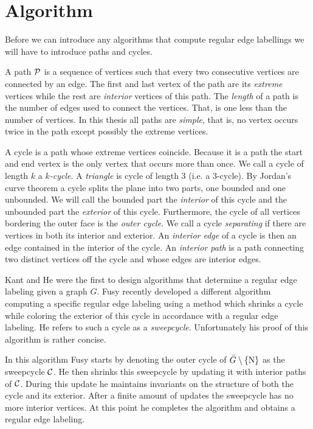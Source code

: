 
\section{Algorithm}
\thispagestyle{plain}
\label{s:algo}

Before we can introduce any algorithms that compute regular edge labellings we will have to introduce paths and cycles.

  A path $\P$ is a sequence of vertices such that every two consecutive vertices are connected by an edge. The first and last vertex of the path are its \emph{extreme} vertices while the rest are \emph{interior} vertices of this path. The \emph{length} of a path is the number of edges used to connect the vertices. That, is one less than the number of vertices. In this thesis all paths are \emph{simple}, that is, no vertex occurs twice in the path except possibly the extreme vertices.

  A cycle is a path whose extreme vertices coincide. Because it is a path the start and end vertex is the only vertex that occurs more than once. We call a cycle of length $k$  a \emph{$k$-cycle}. A \emph{triangle} is cycle of length $3$ (i.e. a $3$-cycle). By Jordan's curve theorem a cycle splits the plane into two parts, one bounded and one unbounded. We will call the bounded part the \emph{interior} of this cycle and the unbounded part the \emph{exterior} of this cycle.
  Furthermore, the cycle of all vertices bordering the outer face is the \emph{outer cycle}.
  We call a cycle \emph{separating} if there are vertices in both its interior and exterior.
  An \emph{interior edge} of a cycle is then an edge contained in the interior of the cycle.
  An \emph{interior path} is a path connecting two distinct vertices off the cycle and whose edges are interior edges.

  Kant and He \cite{Kant1997} were the first to design algorithms that determine a regular edge labeling given a graph $G$. Fusy \cite{Fusy2006} recently developed a different algorithm computing a specific regular edge labeling using a method which shrinks a cycle while coloring the exterior of this cycle in accordance with a regular edge labeling. He refers to such a cycle as a \emph{sweepcycle}. Unfortunately his proof of this algorithm is rather concise.

  In this algorithm Fusy starts by denoting the outer cycle of $\ext G \sm{\pN}$ as the sweepcycle $\C$. He then shrinks this sweepcycle by updating it with interior paths of $\C$. During this update he maintains invariants on the structure of both the cycle and its exterior.
  After a finite amount of updates the sweepcycle has no more interior vertices. At this point he completes the algorithm and obtains a regular edge labeling.

